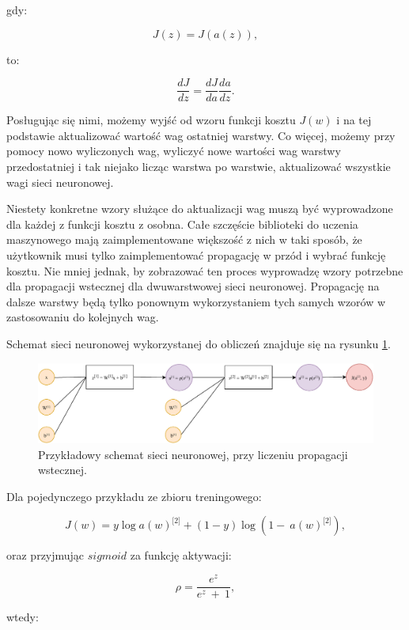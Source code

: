 gdy:

\[J\left( z \right) = J(a\left( z \right)), \tag{5}\]

to:

\[\frac{dJ}{dz} = \frac{dJ}{da} \frac{da}{dz}. \tag{6}\]

Posługując się nimi, możemy wyjść od wzoru funkcji kosztu \(J(w)\) i na tej podstawie aktualizować wartość wag ostatniej warstwy. Co więcej, możemy przy pomocy nowo wyliczonych wag, wyliczyć nowe wartości wag warstwy przedostatniej i tak niejako licząc warstwa po warstwie, aktualizować wszystkie wagi sieci neuronowej.

Niestety konkretne wzory służące do aktualizacji wag muszą być wyprowadzone dla każdej z funkcji kosztu z osobna. Całe szczęście biblioteki do uczenia maszynowego mają zaimplementowane większość z nich w taki sposób, że użytkownik musi tylko zaimplementować propagację w przód i wybrać funkcję kosztu. Nie mniej jednak, by zobrazować ten proces wyprowadzę wzory potrzebne dla propagacji wstecznej dla dwuwarstwowej sieci neuronowej. Propagację na dalsze warstwy będą tylko ponownym wykorzystaniem
tych samych wzorów w zastosowaniu do kolejnych wag.

Schemat sieci neuronowej wykorzystanej do obliczeń znajduje się na rysunku \ref{fig:backprop_fc}.

\begin{figure}[ht]
\centerline{\includegraphics[scale=0.7]{resources/fc/backprop_fc_cross_entropy.pdf}}
\caption{Przykładowy schemat sieci neuronowej, przy liczeniu propagacji
wstecznej.}
\label{fig:backprop_fc}
\end{figure}

Dla pojedynczego przykładu ze zbioru treningowego:

\[J\left( w \right) = y\log{a(w)^{\lbrack 2\rbrack} + \left( 1 - y \right)\log{(1 - \ a(w)^{\lbrack 2\rbrack})}}, \tag{7}\]

oraz przyjmując \(sigmoid\) za funkcję aktywacji:

\[\rho = \frac{e^{z}}{e^{z}\  + \ 1}, \tag{8}\]

wtedy:

